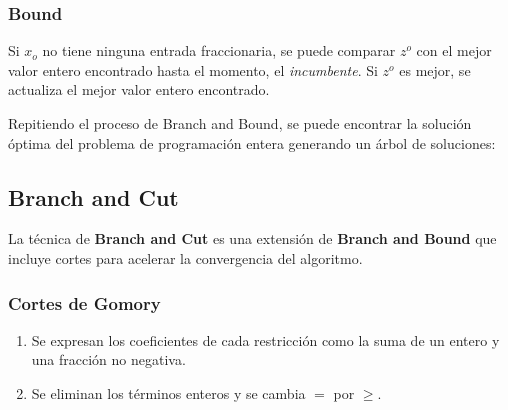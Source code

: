 \documentclass{article}
\begin{document}
\subsubsection{Bound}

Si $x_o$ no tiene ninguna entrada fraccionaria, se puede comparar $z^o$ con el mejor valor entero encontrado hasta el momento, el \textit{incumbente}. Si $z^o$ es mejor, se actualiza el mejor valor entero encontrado.

Repitiendo el proceso de Branch and Bound, se puede encontrar la solución óptima del problema de programación entera generando un árbol de soluciones:

\begin{center}
\end{center}

\subsection{Branch and Cut}

La técnica de \textbf{Branch and Cut} es una extensión de \textbf{Branch and Bound} que incluye cortes para acelerar la convergencia del algoritmo.

\subsubsection{Cortes de Gomory}

\begin{enumerate}
    \item Se expresan los coeficientes de cada restricción como la suma de un entero y una fracción no negativa.
    \item Se eliminan los términos enteros y se cambia $=$ por $\geq$.
\end{enumerate}
\end{document}
